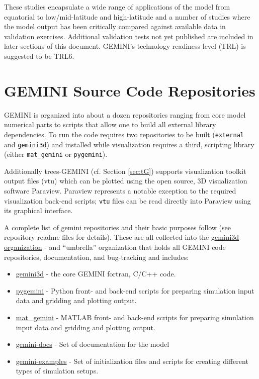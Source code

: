 \documentclass[11pt,letterpaper]{article}
\begin{document}
These studies encapsulate a wide range of applications of the model from equatorial to low/mid-latitude and high-latitude and a number of studies where the model output has been critically compared against available data in validation exercises.  Additional validation tests not yet published are included in later sections of this document.  GEMINI's technology readiness level (TRL) is  suggested to be TRL6.  



\section{GEMINI Source Code Repositories}

GEMINI is organized into about a dozen repositories ranging from core model numerical parts to scripts that allow one to build all external library dependencies.  To run the code requires two repositories to be built (\texttt{external} and \texttt{gemini3d}) and installed while visualization requires a third, scripting library (either \texttt{mat\_gemini} or \texttt{pygemini}).  

Additionally trees-GEMINI (cf. Section \ref{sec:tG}) supports visualization toolkit output files (vtu) which can be plotted using the open source, 3D visualization software Paraview.  Paraview represents a notable exception to the required visualization back-end scripts; \texttt{vtu} files can be read directly into Paraview using its graphical interface.  

A complete list of gemini repositories and their basic purposes follow (see repository readme files for details).  These are all collected into the \href{https://github.com/gemini3d/}{gemini3d organization} - and ``umbrella'' organization that holds all GEMINI code repositories, documentation, and bug-tracking and includes:  
\begin{itemize}
  \item \href{https://github.com/gemini3d/gemini3d/}{gemini3d} - the core GEMINI fortran, C/C++ code.  
  \item \href{https://github.com/gemini3d/pygemini}{pygemini} - Python front- and back-end scripts for preparing simulation input data and gridding and plotting output.  
  \item \href{https://github.com/gemini3d/pygemini}{mat\_gemini} - MATLAB front- and back-end scripts for preparing simulation input data and gridding and plotting output.  
  \item  \href{https://github.com/gemini3d/gemini-docs}{gemini-docs} - Set of documentation for the model
  \item  \href{https://github.com/gemini3d/gemini-examples}{gemini-examples} - Set of initialization files and scripts for creating different types of simulation setups.    
\end{itemize}
\end{document}
